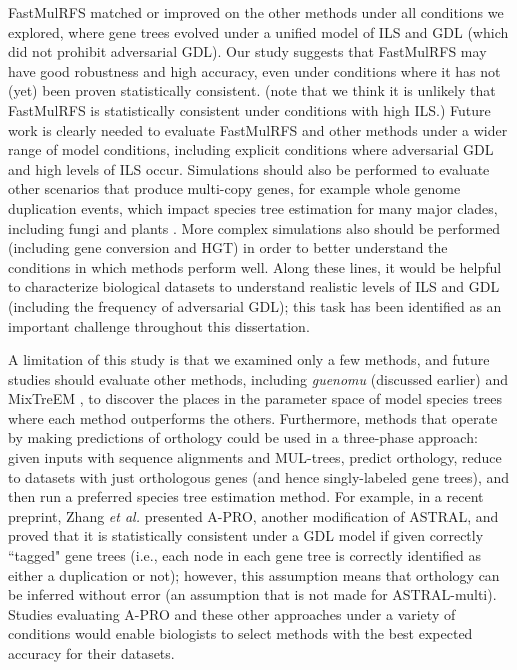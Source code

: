 FastMulRFS matched or improved on the other methods under all conditions we explored, where gene trees evolved under a unified model of ILS and GDL (which did not prohibit adversarial GDL).
Our study suggests that FastMulRFS may have good robustness and high accuracy, even under conditions where it has not (yet) been proven statistically consistent. 
(note that we think it is unlikely that FastMulRFS is statistically consistent under conditions with high ILS.)
Future work is clearly needed to evaluate FastMulRFS and other methods under a wider range of model conditions, including explicit conditions where adversarial GDL and high levels of ILS occur.
Simulations should also be performed to evaluate other scenarios that produce multi-copy genes, for example whole genome duplication events, which impact species tree estimation for many major clades, including fungi \cite{butler2009evolution} and plants \cite{leebensmack2019one}.
More complex simulations also should be performed (including gene conversion and HGT) in order to better understand the conditions in which methods perform well. 
Along these lines, it would be helpful to characterize biological datasets to understand realistic levels of ILS and GDL (including the frequency of adversarial GDL); this task has been identified as an important challenge throughout this dissertation. 

A limitation of this study is that we examined only a few methods, and future studies should evaluate other methods, including {\em guenomu} (discussed earlier) and MixTreEM \cite{ullah2015species-mixtrem}, to discover the places in the parameter space of model species trees where each method outperforms the others.
Furthermore, methods that operate by making predictions of orthology could be used in a three-phase approach: given inputs with sequence alignments and MUL-trees, predict orthology, reduce to datasets with just orthologous genes (and hence singly-labeled gene trees), and then run a preferred species tree estimation method. 
For example, in a recent preprint, Zhang {\em et al.} \cite{zhang2020astral-pro} presented A-PRO, another modification of ASTRAL, and proved that it is statistically consistent under a GDL model if given correctly ``tagged" gene trees (i.e., each node in each gene tree is correctly identified as either a duplication or not); however, this assumption means that orthology can be inferred without error (an assumption that is not made for ASTRAL-multi).
Studies evaluating A-PRO and these other approaches under a variety of conditions would enable biologists to select methods with the best expected accuracy for their datasets.

